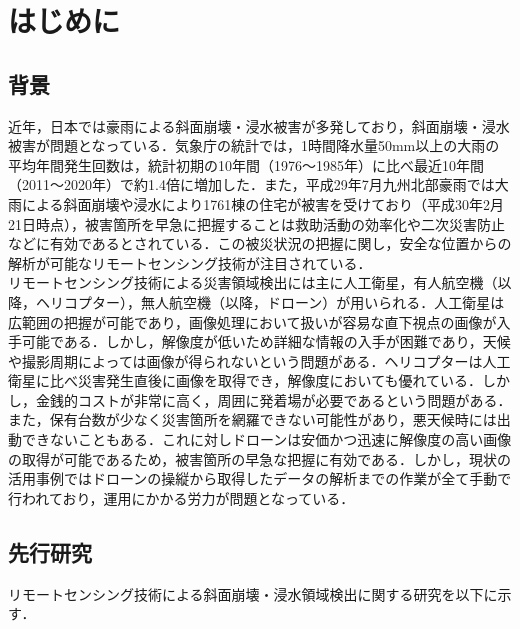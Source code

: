 \documentclass[../Thesis]{subfiles}
\begin{document}
\chapter{はじめに}
\label{cha:はじめに}
\section{背景}
  近年，日本では豪雨による斜面崩壊・浸水被害が多発しており，斜面崩壊・浸水被害が問題となっている．気象庁の統計では，1時間降水量50mm以上の大雨の平均年間発生回数は，統計初期の10年間（1976～1985年）に比べ最近10年間（2011～2020年）で約1.4倍に増加した\cite{web01}．また，平成29年7月九州北部豪雨では大雨による斜面崩壊や浸水により1761棟の住宅が被害を受けており（平成30年2月21日時点）\cite{art01}，被害箇所を早急に把握することは救助活動の効率化や二次災害防止などに有効であるとされている．この被災状況の把握に関し，安全な位置からの解析が可能なリモートセンシング技術が注目されている\cite{art00}．\\
  \quad リモートセンシング技術による災害領域検出には主に人工衛星，有人航空機（以降，ヘリコプター），無人航空機（以降，ドローン）が用いられる．人工衛星は広範囲の把握が可能であり，画像処理において扱いが容易な直下視点の画像が入手可能である．しかし，解像度が低いため詳細な情報の入手が困難であり，天候や撮影周期によっては画像が得られないという問題がある．ヘリコプターは人工衛星に比べ災害発生直後に画像を取得でき，解像度においても優れている．しかし，金銭的コストが非常に高く，周囲に発着場が必要であるという問題がある．また，保有台数が少なく災害箇所を網羅できない可能性があり，悪天候時には出動できないこともある．これに対しドローンは安価かつ迅速に解像度の高い画像の取得が可能であるため，被害箇所の早急な把握に有効である．しかし，現状の活用事例ではドローンの操縦から取得したデータの解析までの作業が全て手動で行われており，運用にかかる労力が問題となっている\cite{art02}． \\



\section{先行研究}
  リモートセンシング技術による斜面崩壊・浸水領域検出に関する研究を以下に示す．
\end{document}
